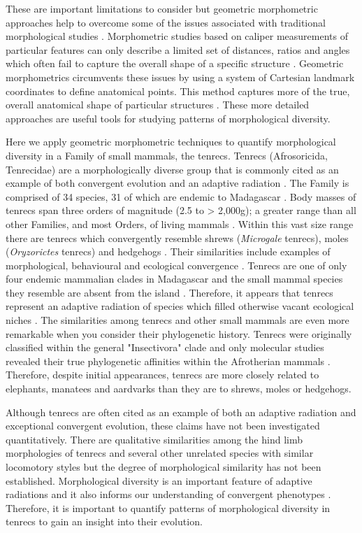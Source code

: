 \documentclass[12pt,a4paper]{article}
\begin{document}
	These are important limitations to consider but geometric morphometric approaches help to overcome some of the issues associated with traditional morphological studies \citep{Adams2004}. Morphometric studies based on caliper measurements of particular features can only describe a limited set of distances, ratios and angles which often fail to capture the overall shape of a specific structure \citep{Slice2007}. Geometric morphometrics circumvents these issues by using a system of Cartesian landmark coordinates to define anatomical points. This method captures more of the true, overall anatomical shape of particular structures \citep{Mitteroecker2009}. These more detailed approaches are useful tools for studying patterns of morphological diversity.
	
	Here we apply geometric morphometric techniques to quantify morphological diversity in a Family of small mammals, the tenrecs. Tenrecs (Afrosoricida, Tenrecidae) are a morphologically diverse group that is commonly cited as an example of both convergent evolution and an adaptive radiation \citep{Soarimalala2011, Eisenberg1969}. The Family is comprised of 34 species, 31 of which are endemic to Madagascar \citep{Olson2013}. Body masses of tenrecs span three orders of magnitude (2.5 to > 2,000g); a greater range than all other Families, and most Orders, of living mammals \citep{Olson2003}. Within this vast size range there are tenrecs which convergently resemble shrews (\textit{Microgale} tenrecs), moles (\textit{Oryzorictes} tenrecs) and hedgehogs \citep[\textit{Echinops} and \textit{Setifer} tenrecs,][]{Eisenberg1969}. Their similarities include examples of morphological, behavioural and ecological convergence \citep{Soarimalala2011}. Tenrecs are one of only four endemic mammalian clades in Madagascar and the small mammal species they resemble are absent from the island \citep{Garbutt1999}. Therefore, it appears that tenrecs represent an adaptive radiation of species which filled otherwise vacant ecological niches \citep{Soarimalala2011}.
	The similarities among tenrecs and other small mammals are even more remarkable when you consider their phylogenetic history. Tenrecs were originally classified within the general "Insectivora" clade and only molecular studies revealed their true phylogenetic affinities within the Afrotherian mammals \citep{Stanhope1998}. Therefore, despite initial appearances, tenrecs are more closely related to elephants, manatees and aardvarks than they are to shrews, moles or hedgehogs. 

	Although tenrecs are often cited as an example of both an adaptive radiation and exceptional convergent evolution, these claims have not been investigated quantitatively. There are qualitative similarities among the hind limb morphologies of tenrecs and several other unrelated species with similar locomotory styles \citep{Salton2009} but the degree of morphological similarity has not been established. Morphological diversity is an important feature of adaptive radiations \citep{Losos2010a} and it also informs our understanding of convergent phenotypes \citep{Muschick2012}. Therefore, it is important to quantify patterns of morphological diversity in tenrecs to gain an insight into their evolution. 
	
\end{document}
